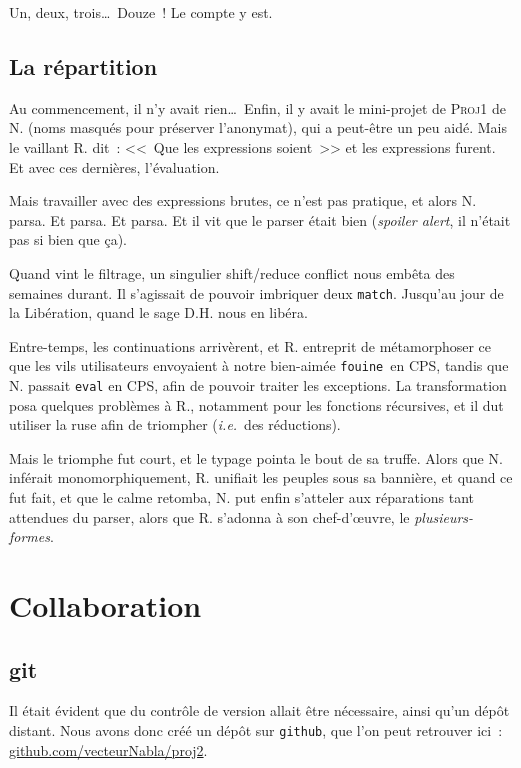 \documentclass[a4, 12pt, titlepage]{scrartcl}
\newcommand{\ie}[0]{\textit{i.e.}}
\newcommand{\fouine}[0]{\texttt{fouine}}
\begin{document}
Un, deux, trois\ldots\ Douze~! Le compte y est.

\subsection{La répartition}\label{subsec:22}

Au commencement, il n'y avait rien\ldots\ Enfin, il y avait le
mini-projet de \textsc{Proj1} de N. (noms masqués pour préserver
l'anonymat), qui a peut-être un peu aidé. Mais le vaillant R. dit~:
<<~Que les expressions soient~>> et les expressions furent. Et avec
ces dernières, l'évaluation.

Mais travailler avec des expressions brutes, ce n'est pas pratique, et
alors N. parsa. Et parsa. Et parsa. Et il vit que le parser était bien
(\emph{spoiler alert}, il n'était pas si bien que ça).

Quand vint le filtrage, un singulier shift/reduce conflict nous
embêta des semaines durant. Il s'agissait de pouvoir imbriquer deux
\texttt{match}. Jusqu'au jour de la Libération, quand le
sage D.H. nous en libéra.

Entre-temps, les continuations arrivèrent, et R. entreprit de
métamorphoser ce que les vils utilisateurs envoyaient à notre
bien-aimée \fouine\ en CPS, tandis que N. passait \texttt{eval} en
CPS, afin de pouvoir traiter les exceptions. La transformation posa
quelques problèmes à R., notamment pour les fonctions récursives, et
il dut utiliser la ruse afin de triompher (\ie\ des réductions).

Mais le triomphe fut court, et le typage pointa le bout de sa
truffe. Alors que N. inférait monomorphiquement, R. unifiait les
peuples sous sa bannière, et quand ce fut fait, et que le calme
retomba, N. put enfin s'atteler aux réparations tant attendues du
parser, alors que R. s'adonna à son chef-d'œuvre, le \emph{plusieurs-formes}.

\section{Collaboration}\label{sec:3}

\subsection{git}\label{subsec:31}

Il était évident que du contrôle de version allait être nécessaire,
ainsi qu'un dépôt distant. Nous avons donc créé un dépôt sur
\texttt{github}, que l'on peut retrouver ici~:
\url{github.com/vecteurNabla/proj2}.
\end{document}
